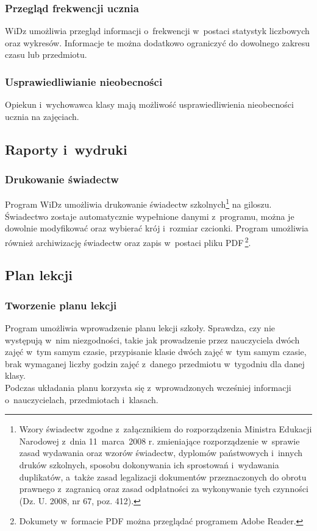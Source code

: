 \documentclass[12pt,leqno,twoside]{mwart}
\begin{document}
\subsubsection{Przegląd frekwencji ucznia}
\noindent WiDz umożliwia przegląd informacji o~frekwencji w~postaci statystyk liczbowych oraz wykresów. Informacje te można dodatkowo ograniczyć do dowolnego zakresu czasu lub przedmiotu.

\subsubsection{Usprawiedliwianie nieobecności}
\noindent Opiekun i~wychowawca klasy mają możliwość usprawiedliwienia nieobecności ucznia na zajęciach.

\subsection{Raporty i~wydruki}
\subsubsection{Drukowanie świadectw} 
\noindent Program WiDz umożliwia drukowanie świadectw szkolnych\footnote{Wzory świadectw zgodne z~załącznikiem do rozporządzenia Ministra Edukacji Narodowej z~dnia 11~marca~2008 r. zmieniające rozporządzenie w~sprawie zasad wydawania oraz wzorów świadectw, dyplomów państwowych i~innych druków szkolnych, sposobu dokonywania ich sprostowań i~wydawania duplikatów, a~także zasad legalizacji dokumentów przeznaczonych do obrotu prawnego z~zagranicą oraz zasad odpłatności za wykonywanie tych czynności (Dz. U. 2008, nr 67, poz. 412).} na giloszu. Świadectwo zostaje automatycznie wypełnione danymi z~programu, można je dowolnie modyfikować oraz wybierać krój i~rozmiar czcionki. Program umożliwia również archiwizację świadectw oraz zapis w~postaci pliku PDF\,\footnote{Dokumety w~formacie PDF można przeglądać programem Adobe Reader.}.

\subsection{Plan lekcji}
\subsubsection{Tworzenie planu lekcji}
\noindent Program umożliwia wprowadzenie planu lekcji szkoły. Sprawdza, czy nie występują w~nim niezgodności, takie jak prowadzenie przez nauczyciela dwóch zajęć w~tym samym czasie, przypisanie klasie dwóch zajęć w~tym samym czasie, brak wymaganej liczby godzin zajęć z~danego przedmiotu w~tygodniu dla danej klasy.\\
\indent Podczas układania planu korzysta się z~wprowadzonych wcześniej informacji o~nauczycielach, przedmiotach i~klasach.
\end{document}
